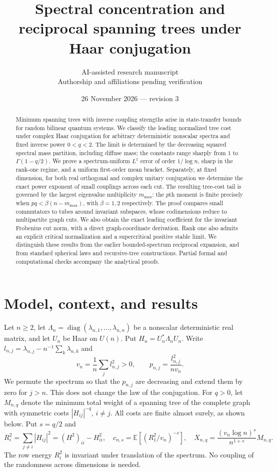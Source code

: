 \documentclass[11pt]{article}
\title{Spectral concentration and reciprocal spanning trees under Haar conjugation}
\author{AI-assisted research manuscript\\\small Authorship and affiliations pending verification}
\date{26 November 2026 --- revision 3}
\newcommand{\E}{\mathbb E}
\newcommand{\diag}{\operatorname{diag}}
\begin{document}
\maketitle
\begin{abstract}
Minimum spanning trees with inverse coupling strengths arise in state-transfer bounds for random bilinear quantum systems. We classify the leading normalized tree cost under complex Haar conjugation for arbitrary deterministic nonscalar spectra and fixed inverse power $0<q<2$. The limit is determined by the decreasing squared spectral mass partition, including diffuse mass; the constants range sharply from $1$ to $\Gamma(1-q/2)$. We prove a spectrum-uniform $L^1$ error of order $1/\log n$, sharp in the rank-one regime, and a uniform first-order mean bracket. Separately, at fixed dimension, for both real orthogonal and complex unitary conjugation we determine the exact power exponent of small couplings across each cut. The resulting tree-cost tail is governed by the largest eigenvalue multiplicity $m_{\max}$: the $p$th moment is finite precisely when $pq<\beta(n-m_{\max})$, with $\beta=1,2$ respectively. The proof compares small commutators to tubes around invariant subspaces, whose codimensions reduce to multipartite graph cuts. We also obtain the exact leading coefficient for the invariant Frobenius cut norm, with a direct graph-coordinate derivation. Rank one also admits an explicit critical normalization and a supercritical positive stable limit. We distinguish these results from the earlier bounded-spectrum reciprocal expansion, and from standard spherical laws and recursive-tree constructions. Partial formal and computational checks accompany the analytical proofs.
\end{abstract}

\section{Model, context, and results}
Let $n\ge2$, let $\Lambda_n=\diag(\lambda_{n,1},\ldots,\lambda_{n,n})$ be a nonscalar deterministic real matrix, and let $U_n$ be Haar on $U(n)$. Put $H_n=U_n^*\Lambda_n U_n$. Write $l_{n,j}=\lambda_{n,j}-n^{-1}\sum_k\lambda_{n,k}$ and
\[
v_n=\frac1n\sum_j l_{n,j}^2>0,\qquad
p_{n,j}=\frac{l_{n,j}^2}{nv_n}.
\]
We permute the spectrum so that the $p_{n,j}$ are decreasing and extend them by zero for $j>n$. This does not change the law of the conjugation. For $q>0$, let $M_{n,q}$ denote the minimum total weight of a spanning tree of the complete graph with symmetric costs $|H_{ij}|^{-q}$, $i\ne j$. All costs are finite almost surely, as shown below. Put $s=q/2$ and
\begin{equation}
R_i^2=\sum_{j\ne i}|H_{ij}|^2=(H^2)_{ii}-H_{ii}^2,\quad
c_{n,s}=\E[(R_1^2/v_n)^{-s}],\quad
X_{n,q}=\frac{(v_n\log n)^s}{n^{1+s}}M_{n,q}.
\label{eq:normalization}
\end{equation}
The row energy $R_i^2$ is invariant under translation of the spectrum. No coupling of the randomness across dimensions is needed.
\end{document}
